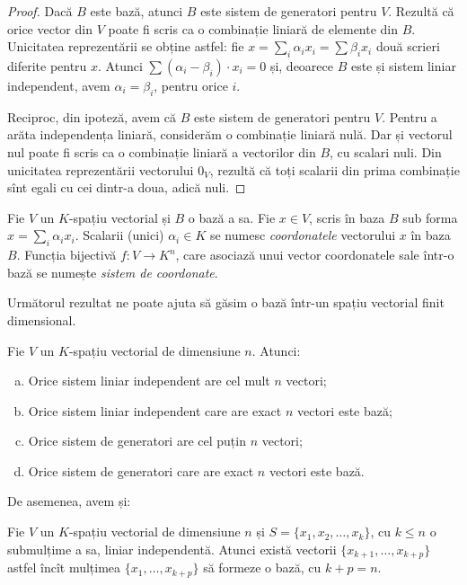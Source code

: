 \begin{proof}
Dacă $B$ este bază, atunci $B$ este sistem de generatori pentru $V$. Rezultă că 
orice vector din $V$ poate fi scris ca o combinație liniară de elemente din $B$. 
Unicitatea reprezentării se obține astfel: fie 
$x = \sum_i \alpha_i x_i = \sum \beta_i x_i$ două scrieri diferite pentru $x$. 
Atunci $\sum (\alpha_i - \beta_i) \cdot x_i = 0$ și, deoarece $B$ este și sistem 
liniar independent, avem $\alpha_i = \beta_i$, pentru orice $i$.

Reciproc, din ipoteză, avem că $B$ este sistem de generatori pentru $V$. Pentru 
a arăta independența liniară, considerăm o combinație liniară nulă. Dar și 
vectorul nul poate fi scris ca o combinație liniară a vectorilor din $B$, cu 
scalari nuli. Din unicitatea reprezentării vectorului $0_V$, rezultă că toți 
scalarii din prima combinație sînt egali cu cei dintr-a doua, adică nuli.
\end{proof}

\begin{definition} 
Fie $V$ un $K$-spațiu vectorial și $B$ o bază a sa. Fie $x \in V$, scris în 
baza $B$ sub forma $x = \sum_i \alpha_i x_i$. Scalarii (unici) 
$\alpha_i \in K$ se numesc \emph{coordonatele} vectorului $x$ în baza $B$. 
Funcția bijectivă $f : V \to K^n$, care asociază unui vector coordonatele 
sale într-o bază se numește \emph{sistem de coordonate}.
\end{definition}

Următorul rezultat ne poate ajuta să găsim o bază într-un spațiu vectorial 
finit dimensional.

\begin{proposition}
Fie $V$ un $K$-spațiu vectorial de dimensiune $n$. Atunci:
\begin{enumerate}[(a)]
\item Orice sistem liniar independent are cel mult $n$ vectori;
\item Orice sistem liniar independent care are exact $n$ vectori este bază;
\item Orice sistem de generatori are cel puțin $n$ vectori;
\item Orice sistem de generatori care are exact $n$ vectori este bază.
\end{enumerate}
\end{proposition}

De asemenea, avem și:
\begin{theorem}
Fie $V$ un $K$-spațiu vectorial de dimensiune $n$ și 
$S = \{x_1, x_2, \dots, x_k\}$, cu $k \leq n$ o submulțime a sa, liniar 
independentă. Atunci există vectorii $\{x_{k+1}, \dots, x_{k+p}\}$ astfel 
încît mulțimea $\{x_1,\dots, x_{k+p}\}$ să formeze o bază, cu $k + p = n$.
\end{theorem}

